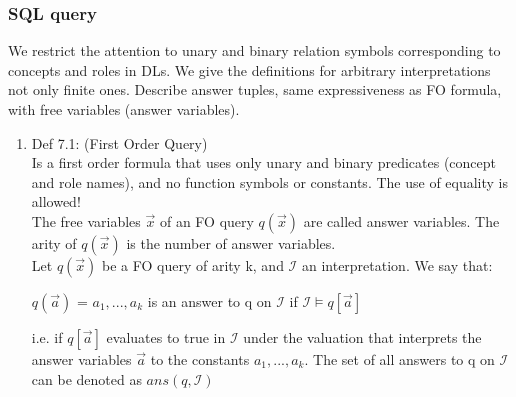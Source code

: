 \documentclass[11pt]{article}
\begin{document}
\subsubsection{SQL query}
\label{sec-1-1-2}
We restrict the attention to unary and binary relation symbols 
corresponding to concepts and roles in DLs. We give the definitions
for arbitrary interpretations not only finite ones.
Describe answer tuples, same expressiveness as FO formula, with 
free variables (answer variables).
\begin{enumerate}
\item Def 7.1: (First Order Query) \\
\label{sec-1-1-2-1}
Is a first order formula that uses only unary and binary 
predicates (concept and role names), and no function symbols or 
constants. The use of equality is allowed!\\
     The free variables $\overset{\to}{x}$ of an FO query 
$q(\overset{\to}{x})$ are called answer variables. The arity of 
$q(\overset{\to}{x})$ is the number of answer variables.\\
     Let $q(\overset{\to}{x})$ be a FO query of arity k, and $\mathcal{I}$
an interpretation. We say that:
\begin{center}
$q(\overset{\to}{a})$ = $a_{1}, ..., a_{k}$ is an answer to q on 
$\mathcal{I}$ if $\mathcal{I} \models q[\overset{\to}{a}]$\\
\end{center}
i.e. if $q[\overset{\to}{a}]$ evaluates to true in $\mathcal{I}$ under 
the valuation that interprets the answer variables $\overset{\to}{a}$ 
to the constants $a_{1}, ..., a_{k}$. The set of all answers to q 
on $\mathcal{I}$ can be denoted as $ans(q,\mathcal{I})$ 


\end{enumerate}
\end{document}
